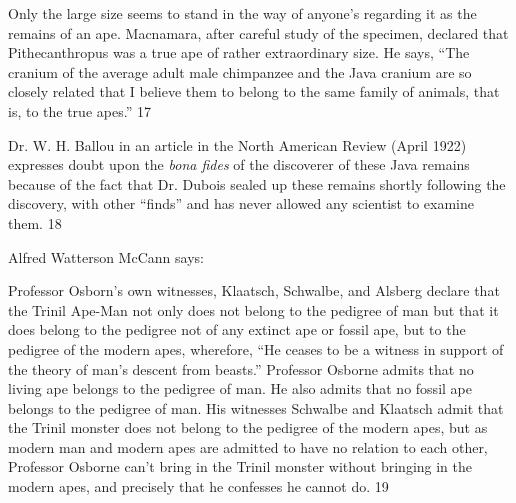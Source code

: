 Only the large size seems to stand in the way of anyone's regarding it as the remains of an
ape. Macnamara, after careful study of the specimen, declared that Pithecanthropus was a
true ape of rather extraordinary size. He says, ``The cranium of the average adult male
chimpanzee and the Java cranium are so closely related that I believe them to belong to the
same family of animals, that is, to the true apes.'' 17

Dr. W. H. Ballou in an article in the North American Review (April 1922) expresses doubt
upon the \textit{bona fides} of the discoverer of these Java remains because of the fact that Dr.
Dubois sealed up these remains shortly following the discovery, with other ``finds'' and has
never allowed any scientist to examine them. 18

Alfred Watterson McCann says:

Professor Osborn's own witnesses, Klaatsch, Schwalbe, and Alsberg declare that the Trinil
Ape-Man not only does not belong to the pedigree of man but that it does belong to the
pedigree not of any extinct ape or fossil ape, but to the pedigree of the modern apes,
wherefore, ``He ceases to be a witness in support of the theory of man's descent from beasts.''
Professor Osborne admits that no living ape belongs to the pedigree of man. He also admits
that no fossil ape belongs to the pedigree of man. His witnesses Schwalbe and Klaatsch admit
that the Trinil monster does not belong to the pedigree of the modern apes, but as modern
man and modern apes are admitted to have no relation to each other, Professor Osborne can't
bring in the Trinil monster without bringing in the modern apes, and precisely that he
confesses he cannot do. 19

